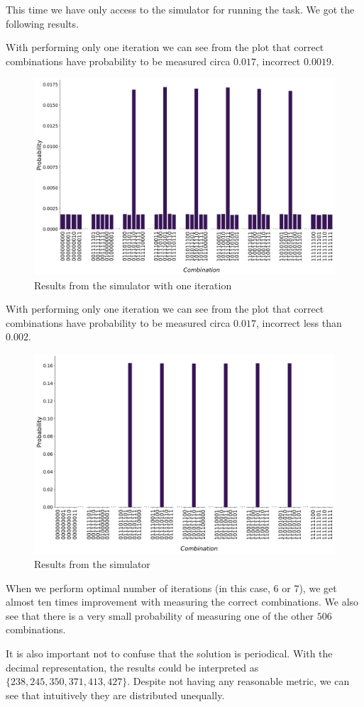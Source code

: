 This time we have only access to the simulator for running the task. We got the following results.

With performing only one iteration we can see from the plot that correct combinations have probability to be measured circa $0.017$, incorrect $0.0019$.

\begin{figure}[H]
\centering
\includegraphics[width=18cm]{Figures/large1iter.png}
\caption{Results from the simulator with one iteration}
\label{After first iteration}
\end{figure}

With performing only one iteration we can see from the plot that correct combinations have probability to be measured circa $0.017$, incorrect less than $0.002$.

\begin{figure}[H]
\centering
\includegraphics[width=17cm]{Figures/largefinal.png}
\caption{Results from the simulator}
\label{sim_large}
\end{figure}

When we perform optimal number of iterations (in this case, 6 or 7), we get almost ten times improvement with measuring the correct combinations. We also see that there is a very small probability of measuring one of the other $506$ combinations.

It is also important not to confuse that the solution is periodical. With the decimal representation, the results could be interpreted as $\{238, 245, 350, 371, 413, 427\}$. Despite not having any reasonable metric, we can see that intuitively they are distributed unequally.
